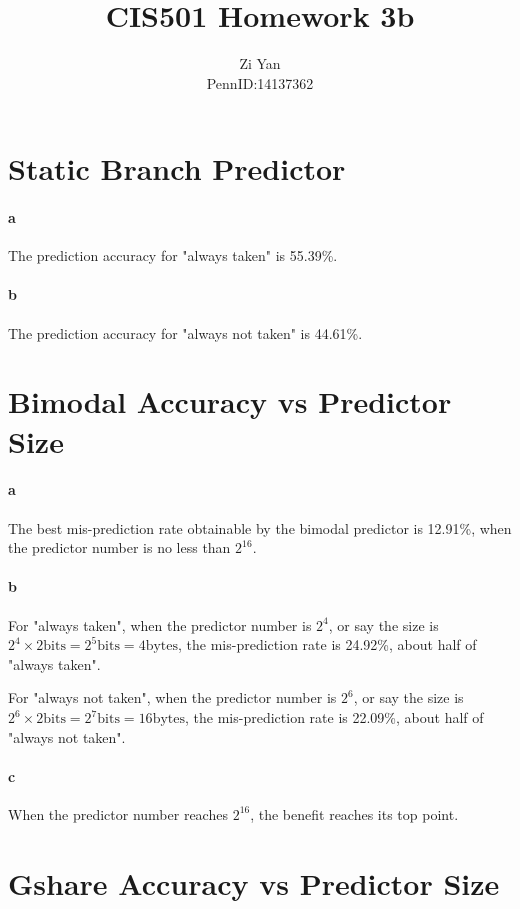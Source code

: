 \documentclass[12pt,letterpaper]{article}
\author{Zi Yan\\PennID:14137362}
\title{CIS501 Homework 3b}
\date{}
\begin{document}
\maketitle
\section{Static Branch Predictor}
\paragraph*{a}
The prediction accuracy for "always taken" is 55.39\%.
\paragraph*{b}
The prediction accuracy for "always not taken" is 44.61\%.

\section{Bimodal Accuracy vs Predictor Size}
\paragraph*{a}
The best mis-prediction rate obtainable by the bimodal predictor is 12.91\%,
when the predictor number is no less than $2^{16}$.

\paragraph*{b}
For "always taken", when the predictor number is $2^{4}$, or say the size is
$2^4 \times 2 \mathrm{bits} = 2^5 \mathrm{bits} = 4 \mathrm{bytes}$, the 
mis-prediction rate is 24.92\%, about half of "always taken".

For "always not taken", when the predictor number is $2^6$, or say the size is
$2^6 \times 2 \mathrm{bits} = 2^7 \mathrm{bits} = 16 \mathrm{bytes}$, the
mis-prediction rate is 22.09\%, about half of "always not taken".

\paragraph*{c}
When the predictor number reaches $2^{16}$, the benefit reaches its top point.

\section{Gshare Accuracy vs Predictor Size}
\end{document}
